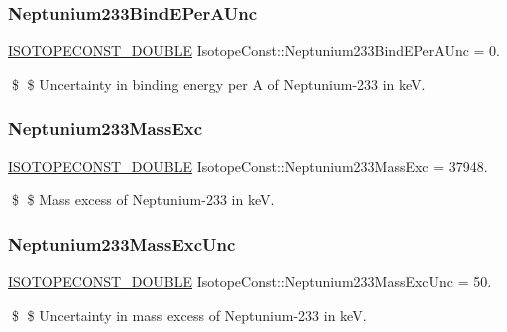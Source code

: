 \subsubsection{\texorpdfstring{Neptunium233\+Bind\+E\+Per\+A\+Unc}{Neptunium233BindEPerAUnc}}
{\footnotesize\ttfamily \mbox{\hyperlink{group___isotope_const-_macros_ga8f45a7272ce02c0b4c65c44636ed719a}{I\+S\+O\+T\+O\+P\+E\+C\+O\+N\+S\+T\+\_\+\+D\+O\+U\+B\+LE}} Isotope\+Const\+::\+Neptunium233\+Bind\+E\+Per\+A\+Unc = 0.}

\$ \$ Uncertainty in binding energy per A of Neptunium-\/233 in keV. \mbox{\label{group___isotope_const-_neptunium-_np233_ga84fc7d5006fcdb3d09941c77909cb57f}} 
\subsubsection{\texorpdfstring{Neptunium233\+Mass\+Exc}{Neptunium233MassExc}}
{\footnotesize\ttfamily \mbox{\hyperlink{group___isotope_const-_macros_ga8f45a7272ce02c0b4c65c44636ed719a}{I\+S\+O\+T\+O\+P\+E\+C\+O\+N\+S\+T\+\_\+\+D\+O\+U\+B\+LE}} Isotope\+Const\+::\+Neptunium233\+Mass\+Exc = 37948.}

\$ \$ Mass excess of Neptunium-\/233 in keV. \mbox{\label{group___isotope_const-_neptunium-_np233_ga79c4e719921fa07c5a1a3edf6655bec1}} 
\subsubsection{\texorpdfstring{Neptunium233\+Mass\+Exc\+Unc}{Neptunium233MassExcUnc}}
{\footnotesize\ttfamily \mbox{\hyperlink{group___isotope_const-_macros_ga8f45a7272ce02c0b4c65c44636ed719a}{I\+S\+O\+T\+O\+P\+E\+C\+O\+N\+S\+T\+\_\+\+D\+O\+U\+B\+LE}} Isotope\+Const\+::\+Neptunium233\+Mass\+Exc\+Unc = 50.}

\$ \$ Uncertainty in mass excess of Neptunium-\/233 in keV. \mbox{\label{group___isotope_const-_neptunium-_np233_gafdf1965f8899d4e42ce35b0013db2747}} 
